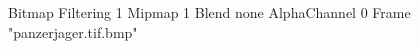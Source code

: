{Bitmap
	{Filtering 1}
	{Mipmap 1}
	{Blend none}
	{AlphaChannel 0}
	{Frame "panzerjager.tif.bmp"}
}
